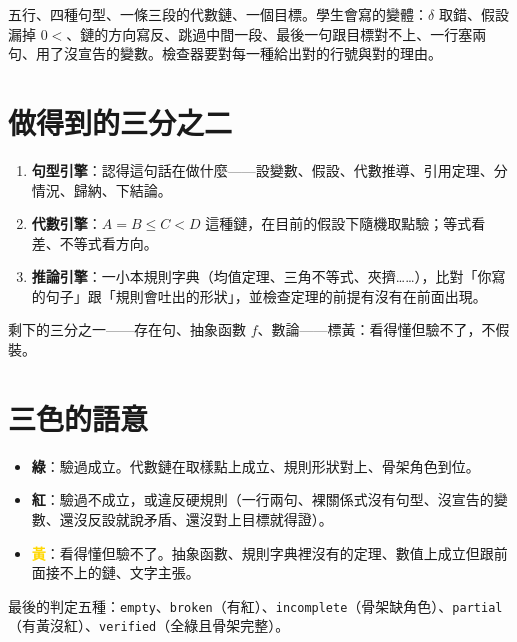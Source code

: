 \documentclass[11pt,a4paper,oneside]{book}
\renewcommand{\_}{\ifmmode\origunderscore\else\textunderscore\allowbreak\fi}
\newcommand{\code}[1]{\texttt{#1}}
\newcommand{\ok}{\textcolor{moss}{\textbf{綠}}}
\newcommand{\bad}{\textcolor{rust}{\textbf{紅}}}
\newcommand{\unsure}{\textcolor{gold}{\textbf{黃}}}
\begin{document}
五行、四種句型、一條三段的代數鏈、一個目標。學生會寫的變體：$\delta$ 取錯、假設漏掉 $0 <$、鏈的方向寫反、跳過中間一段、最後一句跟目標對不上、一行塞兩句、用了沒宣告的變數。檢查器要對每一種給出對的行號與對的理由。

\section{做得到的三分之二}
\begin{enumerate}[label=\arabic*.]
  \item \textbf{句型引擎}：認得這句話在做什麼——設變數、假設、代數推導、引用定理、分情況、歸納、下結論。
  \item \textbf{代數引擎}：$A = B \le C < D$ 這種鏈，在目前的假設下隨機取點驗；等式看差、不等式看方向。
  \item \textbf{推論引擎}：一小本規則字典（均值定理、三角不等式、夾擠……），比對「你寫的句子」跟「規則會吐出的形狀」，並檢查定理的前提有沒有在前面出現。
\end{enumerate}
剩下的三分之一——存在句、抽象函數 $f$、數論——標黃：看得懂但驗不了，不假裝。

\section{三色的語意}
\begin{itemize}
  \item \ok：驗過成立。代數鏈在取樣點上成立、規則形狀對上、骨架角色到位。
  \item \bad：驗過不成立，或違反硬規則（一行兩句、裸關係式沒有句型、沒宣告的變數、還沒反設就說矛盾、還沒對上目標就得證）。
  \item \unsure：看得懂但驗不了。抽象函數、規則字典裡沒有的定理、數值上成立但跟前面接不上的鏈、文字主張。
\end{itemize}
最後的判定五種：\code{empty}、\code{broken}（有紅）、\code{incomplete}（骨架缺角色）、\code{partial}（有黃沒紅）、\code{verified}（全綠且骨架完整）。
\end{document}
